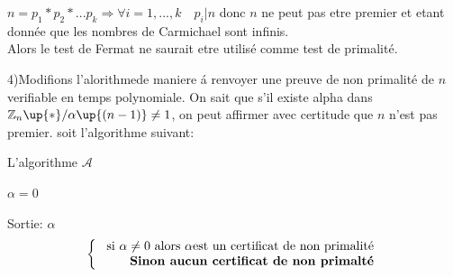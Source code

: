 \documentclass[10pt]{beamer}
\begin{document}
\begin{frame}

$n = p_{1}*p_{2}*...p_{k} \Rightarrow \forall i=1,...,k \quad p_{i}|n$ donc $n$ ne peut pas etre premier et etant donn\'{e}e que les nombres de Carmichael sont infinis.
\\Alors le test de Fermat ne saurait etre utilis\'{e} comme test de primalit\'{e}.

4)Modifions l'alorithmede maniere \'{a}	renvoyer une preuve de non primalit\'{e} de $n$ verifiable en temps polynomiale.
On sait que s'il existe alpha dans $\mathbb{Z}_{n}\up{*} / \alpha\up{(n-1)} \neq 1$, on peut affirmer avec certitude que $n$ n'est pas premier.
soit l'algorithme suivant:

\begin{algorithm}[H]
\DontPrintSemicolon
\caption{L'algorithme $\mathcal{A}$}
\BlankLine
{}
\Return $\alpha = 0$
\end{algorithm}

	
Sortie: $\alpha$
\[
\left\{
\begin{array}{r c l}
 \text{ si } \alpha \neq 0 \text{ alors } \alpha \text{est un certificat de non primalit\'{e}}\\
 \textbf{Sinon aucun certificat de non primalt\'{e}}
\end{array}
\right.
\]
\end{frame}
\end{document}
